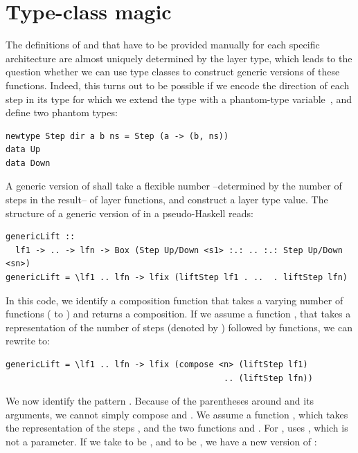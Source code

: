 \documentclass{llncs}
\begin{document}
\section{Type-class magic} \label{sect:typeClass}

The definitions of  and  that have to be provided manually for each specific architecture are almost uniquely determined by the layer type, which leads to the question whether we can use type classes to construct generic versions of these functions. Indeed, this turns out to be possible if we encode the direction of each step in its type for which we extend the  type with a phantom-type variable~\cite{leijen99dsecs}, and define two phantom types:

\begin{small}
\begin{verbatim}
newtype Step dir a b ns = Step (a -> (b, ns))
data Up 
data Down
\end{verbatim}
\end{small}

A generic version of  shall take a flexible number --determined by the number of steps in the result-- of layer functions, and construct a layer type value. The structure of a generic version of  in a pseudo-Haskell reads:

\begin{small}
\begin{verbatim}
genericLift :: 
  lf1 -> .. -> lfn -> Box (Step Up/Down <s1> :.: .. :.: Step Up/Down <sn>)
genericLift = \lf1 .. lfn -> lfix (liftStep lf1 . ..  . liftStep lfn)
\end{verbatim}%
\end{small}

In this code, we identify a composition function that takes a varying number of functions ( to ) and returns a composition. If we assume a function , that takes a representation of the number of steps (denoted by ) followed by  functions, we can rewrite  to:

\begin{small}
\begin{verbatim}
genericLift = \lf1 .. lfn -> lfix (compose <n> (liftStep lf1) 
                                            .. (liftStep lfn))
\end{verbatim}%
\end{small}

We now identify the pattern . Because of the parentheses around  and its arguments, we cannot simply compose  and . We assume a function , which takes the representation of the steps , and the two functions  and . For ,  uses , which is not a parameter. If we take  to be , and  to be , we have a new version of :
\end{document}
